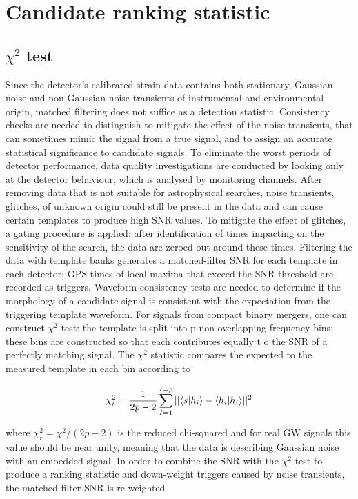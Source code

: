 \documentclass[binding=0.6cm, LaM]{sapthesis}
\begin{document}
\section{Candidate ranking statistic}
	
\subsection{$\chi^2$ test}

	Since the detector’s calibrated strain data contains both stationary, Gaussian noise 
	and non-Gaussian noise transients of instrumental and environmental origin,
	matched filtering does not suffice as a detection statistic.
 	Consistency checks are needed to distinguish to mitigate the effect of the noise transients,
	that can sometimes mimic the signal from a true signal,
	and to assign an accurate statistical significance to candidate signals.
  	To eliminate the worst periods of detector performance, 
	data quality investigations are conducted by looking only at the detector behaviour,  
	which is analysed by monitoring channels.
	After removing data that is not suitable for astrophysical searches, 
	noise transients, glitches, of unknown origin could still be present in the data 
	and can cause certain templates to produce high SNR values.
	To mitigate the effect of glitches, a gating procedure is applied:
	after identification of times impacting on the sensitivity of the search,
	the data are zeroed out around these times.
	Filtering the data with template banks generates a matched-filter SNR for each template in each detector;
	GPS times of local maxima that exceed the SNR threshold are recorded as triggers. 
	Waveform consistency tests are needed to determine if the morphology 
	of a candidate signal is consistent with the expectation from the triggering template waveform.
	For signals from compact binary mergers, one can construct $\chi^2$-test:
	the template is split into p non-overlapping frequency bins; 
	these bins are constructed so that each contributes equally t
	o the SNR of a perfectly matching signal. 
	The $\chi^2$ statistic compares the expected to the measured template in each bin according to 

		\begin{equation}
			\chi^2_r = {1 \over {2p-2}}   \sum_{I=1}^{I=p} || \langle   s|h_i  \rangle -   \langle  h_i|h_i   \rangle ||^2
		\end{equation}

	where $\chi^2_r = \chi^2/(2p-2)$ is the reduced chi-squared and for real GW signals this value should be near unity, 
	meaning that the data is describing Gaussian noise with an embedded signal.
	In order to combine the SNR with the $\chi^2$ test to produce a ranking statistic 
	and down-weight triggers caused by noise transients, 	
	the matched-filter SNR is re-weighted 
\end{document}
